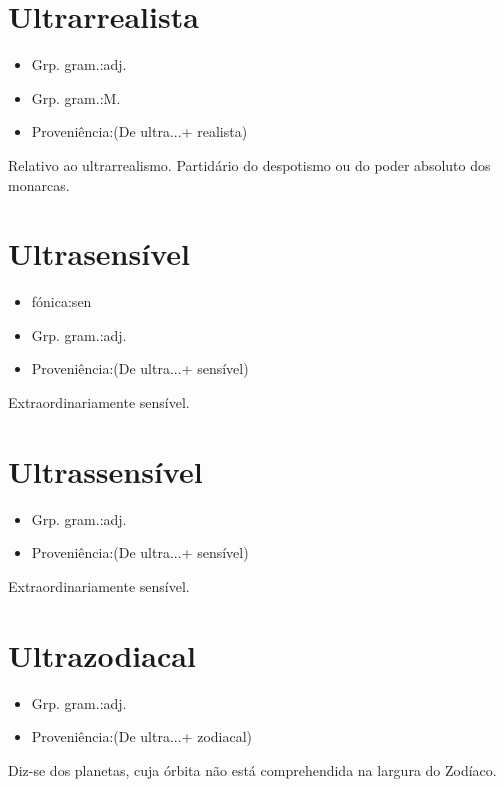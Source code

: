 \documentclass{article}
\begin{document}
\section{Ultrarrealista}
\begin{itemize}
\item {Grp. gram.:adj.}
\end{itemize}
\begin{itemize}
\item {Grp. gram.:M.}
\end{itemize}
\begin{itemize}
\item {Proveniência:(De \textunderscore ultra...\textunderscore  + \textunderscore realista\textunderscore )}
\end{itemize}
Relativo ao ultrarrealismo.
Partidário do despotismo ou do poder absoluto dos monarcas.
\section{Ultrasensível}
\begin{itemize}
\item {fónica:sen}
\end{itemize}
\begin{itemize}
\item {Grp. gram.:adj.}
\end{itemize}
\begin{itemize}
\item {Proveniência:(De \textunderscore ultra...\textunderscore  + \textunderscore sensível\textunderscore )}
\end{itemize}
Extraordinariamente sensível.
\section{Ultrassensível}
\begin{itemize}
\item {Grp. gram.:adj.}
\end{itemize}
\begin{itemize}
\item {Proveniência:(De \textunderscore ultra...\textunderscore  + \textunderscore sensível\textunderscore )}
\end{itemize}
Extraordinariamente sensível.
\section{Ultrazodiacal}
\begin{itemize}
\item {Grp. gram.:adj.}
\end{itemize}
\begin{itemize}
\item {Proveniência:(De \textunderscore ultra...\textunderscore  + \textunderscore zodiacal\textunderscore )}
\end{itemize}
Diz-se dos planetas, cuja órbita não está comprehendida na largura do Zodíaco.
\end{document}
